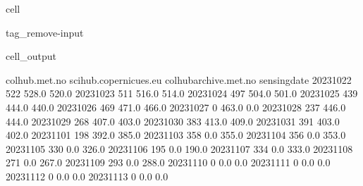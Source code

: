 \documentclass[letterpaper,10pt,english]{jupyterBook}
\begin{document}
\begin{sphinxuseclass}{cell}
\begin{sphinxuseclass}{tag_remove-input}\begin{sphinxVerbatimOutput}

\begin{sphinxuseclass}{cell_output}
\begin{sphinxVerbatim}[commandchars=\\\{\}]
              colhub.met.no  scihub.copernicues.eu  colhub\PYGZhy{}archive.met.no  \PYGZbs{}
sensing\PYGZus{}date                                                                
2023\PYGZhy{}10\PYGZhy{}22              522                  528.0                  520.0   
2023\PYGZhy{}10\PYGZhy{}23              511                  516.0                  514.0   
2023\PYGZhy{}10\PYGZhy{}24              497                  504.0                  501.0   
2023\PYGZhy{}10\PYGZhy{}25              439                  444.0                  440.0   
2023\PYGZhy{}10\PYGZhy{}26              469                  471.0                  466.0   
2023\PYGZhy{}10\PYGZhy{}27                0                  463.0                    0.0   
2023\PYGZhy{}10\PYGZhy{}28              237                  446.0                  444.0   
2023\PYGZhy{}10\PYGZhy{}29              268                  407.0                  403.0   
2023\PYGZhy{}10\PYGZhy{}30              383                  413.0                  409.0   
2023\PYGZhy{}10\PYGZhy{}31              391                  403.0                  402.0   
2023\PYGZhy{}11\PYGZhy{}01              198                  392.0                  385.0   
2023\PYGZhy{}11\PYGZhy{}03              358                    0.0                  355.0   
2023\PYGZhy{}11\PYGZhy{}04              356                    0.0                  353.0   
2023\PYGZhy{}11\PYGZhy{}05              330                    0.0                  326.0   
2023\PYGZhy{}11\PYGZhy{}06              195                    0.0                  190.0   
2023\PYGZhy{}11\PYGZhy{}07              334                    0.0                  333.0   
2023\PYGZhy{}11\PYGZhy{}08              271                    0.0                  267.0   
2023\PYGZhy{}11\PYGZhy{}09              293                    0.0                  288.0   
2023\PYGZhy{}11\PYGZhy{}10                0                    0.0                    0.0   
2023\PYGZhy{}11\PYGZhy{}11                0                    0.0                    0.0   
2023\PYGZhy{}11\PYGZhy{}12                0                    0.0                    0.0   
2023\PYGZhy{}11\PYGZhy{}13                0                    0.0                    0.0   

\end{sphinxVerbatim}
\end{sphinxuseclass}
\end{sphinxVerbatimOutput}
\end{sphinxuseclass}
\end{sphinxuseclass}
\end{document}
